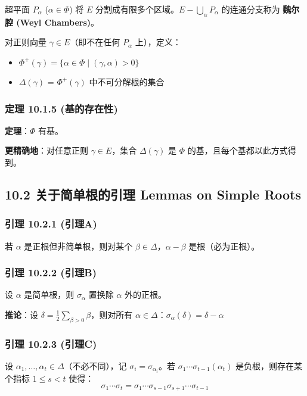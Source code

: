 超平面 $P_\alpha$ ($\alpha \in \Phi$) 将 $E$ 分割成有限多个区域。$E - \bigcup_\alpha P_\alpha$ 的连通分支称为 \textbf{魏尔腔 (Weyl Chambers)}。

对正则向量 $\gamma \in E$（即不在任何 $P_\alpha$ 上），定义：

\begin{itemize}
	\item $\Phi^+(\gamma) = \{\alpha \in \Phi \mid (\gamma, \alpha) > 0\}$
	\item $\Delta(\gamma)$ = $\Phi^+(\gamma)$ 中不可分解根的集合
\end{itemize}

\subsubsection{定理 10.1.5 (基的存在性)}

\textbf{定理}：$\Phi$ 有基。

\textbf{更精确地}：对任意正则 $\gamma \in E$，集合 $\Delta(\gamma)$ 是 $\Phi$ 的基，且每个基都以此方式得到。

\subsection{10.2 关于简单根的引理 Lemmas on Simple Roots}

\subsubsection{引理 10.2.1 (引理A)}

若 $\alpha$ 是正根但非简单根，则对某个 $\beta \in \Delta$，$\alpha - \beta$ 是根（必为正根）。

\subsubsection{引理 10.2.2 (引理B)}

设 $\alpha$ 是简单根，则 $\sigma_\alpha$ 置换除 $\alpha$ 外的正根。

\textbf{推论}：设 $\delta = \frac{1}{2}\sum_{\beta>0} \beta$，则对所有 $\alpha \in \Delta$：$\sigma_\alpha(\delta) = \delta - \alpha$

\subsubsection{引理 10.2.3 (引理C)}

设 $\alpha_1, \ldots, \alpha_t \in \Delta$（不必不同），记 $\sigma_i = \sigma_{\alpha_i}$。若 $\sigma_1 \cdots \sigma_{t-1}(\alpha_t)$ 是负根，则存在某个指标 $1 \leq s < t$ 使得：
\[
\sigma_1 \cdots \sigma_t = \sigma_1 \cdots \sigma_{s-1} \sigma_{s+1} \cdots \sigma_{t-1}
\]

